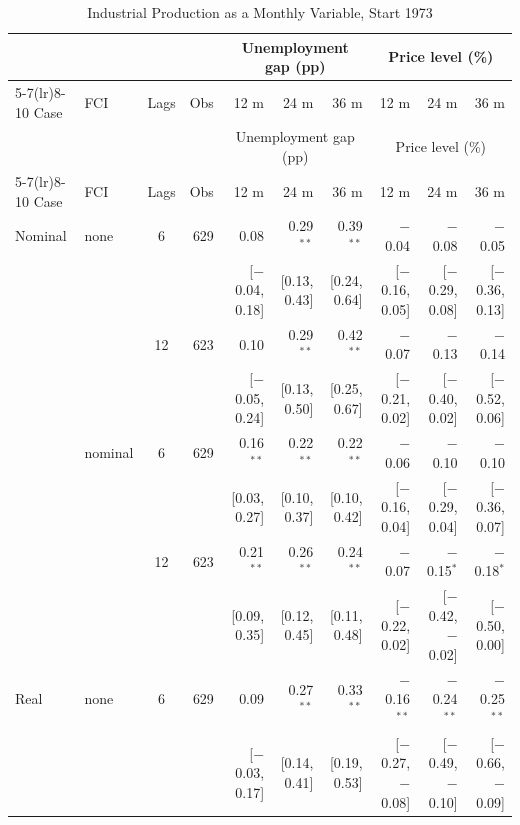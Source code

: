 \begingroup\scriptsize\setlength{\tabcolsep}{0.9pt}
\begin{longtable}{llcrrrrrrr}
\caption{Industrial Production as a Monthly Variable, Start 1973}\label{tab:appR273}\\
\toprule
 & & & & \multicolumn{3}{c}{Unemployment gap (pp)} & \multicolumn{3}{c}{Price level (\%)}\\ \cmidrule(lr){5-7}\cmidrule(lr){8-10}
Case & FCI & Lags & Obs & 12 m & 24 m & 36 m & 12 m & 24 m & 36 m\\
\midrule\endfirsthead
\toprule
 & & & & \multicolumn{3}{c}{Unemployment gap (pp)} & \multicolumn{3}{c}{Price level (\%)}\\ \cmidrule(lr){5-7}\cmidrule(lr){8-10}
Case & FCI & Lags & Obs & 12 m & 24 m & 36 m & 12 m & 24 m & 36 m\\
\midrule\endhead
\bottomrule\endfoot
Nominal & none & 6 & 629 & 0.08 & 0.29$^{**}$ & 0.39$^{**}$ & $-$0.04 & $-$0.08 & $-$0.05\\
 & & & & {\scriptsize [$-$0.04, 0.18]} & {\scriptsize [0.13, 0.43]} & {\scriptsize [0.24, 0.64]} & {\scriptsize [$-$0.16, 0.05]} & {\scriptsize [$-$0.29, 0.08]} & {\scriptsize [$-$0.36, 0.13]}\\
 &  & 12 & 623 & 0.10 & 0.29$^{**}$ & 0.42$^{**}$ & $-$0.07 & $-$0.13 & $-$0.14\\
 & & & & {\scriptsize [$-$0.05, 0.24]} & {\scriptsize [0.13, 0.50]} & {\scriptsize [0.25, 0.67]} & {\scriptsize [$-$0.21, 0.02]} & {\scriptsize [$-$0.40, 0.02]} & {\scriptsize [$-$0.52, 0.06]}\\
 & nominal & 6 & 629 & 0.16$^{**}$ & 0.22$^{**}$ & 0.22$^{**}$ & $-$0.06 & $-$0.10 & $-$0.10\\
 & & & & {\scriptsize [0.03, 0.27]} & {\scriptsize [0.10, 0.37]} & {\scriptsize [0.10, 0.42]} & {\scriptsize [$-$0.16, 0.04]} & {\scriptsize [$-$0.29, 0.04]} & {\scriptsize [$-$0.36, 0.07]}\\
 &  & 12 & 623 & 0.21$^{**}$ & 0.26$^{**}$ & 0.24$^{**}$ & $-$0.07 & $-$0.15$^{*}$ & $-$0.18$^{*}$\\
 & & & & {\scriptsize [0.09, 0.35]} & {\scriptsize [0.12, 0.45]} & {\scriptsize [0.11, 0.48]} & {\scriptsize [$-$0.22, 0.02]} & {\scriptsize [$-$0.42, $-$0.02]} & {\scriptsize [$-$0.50, 0.00]}\\
\addlinespace
Real & none & 6 & 629 & 0.09 & 0.27$^{**}$ & 0.33$^{**}$ & $-$0.16$^{**}$ & $-$0.24$^{**}$ & $-$0.25$^{**}$\\
 & & & & {\scriptsize [$-$0.03, 0.17]} & {\scriptsize [0.14, 0.41]} & {\scriptsize [0.19, 0.53]} & {\scriptsize [$-$0.27, $-$0.08]} & {\scriptsize [$-$0.49, $-$0.10]} & {\scriptsize [$-$0.66, $-$0.09]}\\

\end{longtable}
